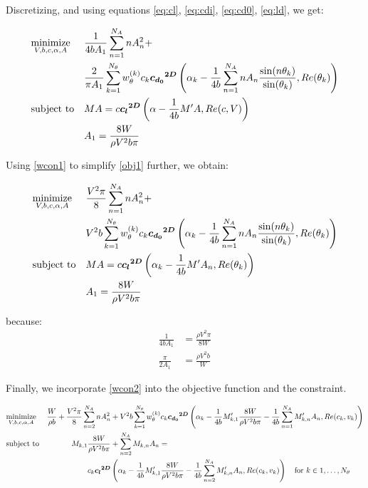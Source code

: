 \documentclass[letterpaper,12pt]{article}
\begin{document}
Discretizing, and using equations \ref{eq:cl}, \ref{eq:cdi}, \ref{eq:cd0}, \ref{eq:ld}, we get:


\begin{align}
	& \underset{V, b, c, \alpha, A}{\text{minimize}}
	& & \frac {1}{4bA_1} \sum_{n=1}^{N_A} n A_{n}^2 + \nonumber \\
	&&& \frac 2 {\pi A_1} \sum_{k=1}^{N_{\theta}} w_{\theta}^{(k)} c_k \boldsymbol{{c_{d_0}}^{2D}}\left( 
		\alpha_k - 
		\frac {1}{4b} \sum_{n=1}^{N_A} n A_n \frac{ \sin(n\theta_k) }{\sin(\theta_k)} , Re(\theta_k)
		\right) \label{obj1} \\
	& \text{subject to}
	& & MA = c \boldsymbol{{c_l}^{2D}} \left( \alpha - \frac {1}{4b} M' A , Re(c, V)\right)   \label{llcon1}\\
	& &  & A_1 = \frac{8W}{\rho V^2 b \pi} \label{wcon1}
\end{align}

Using \ref{wcon1} to simplify \ref{obj1} further, we obtain:

\begin{align}
	& \underset{V, b, c, \alpha, A}{\text{minimize}}
	& & \frac{V^2 \pi}{8}\sum_{n=1}^{N_A} n A_{n}^2 + \nonumber \\
	&&&  V^2 b  \sum_{k=1}^{N_{\theta}} w_{\theta}^{(k)} c_k \boldsymbol{{c_{d_0}}^{2D}}\left( 
		\alpha_k - 
		\frac {1}{4b} \sum_{n=1}^{N_A} n A_n \frac{ \sin(n\theta_k) }{\sin(\theta_k)} , Re(\theta_k)
		\right) \label{obj2} \\
	& \text{subject to}
	& & MA = c \boldsymbol{{c_l}^{2D}} \left( \alpha_k - \frac {1}{4b} M' A_n , Re(\theta_k)\right)  \label{llcon2}\\
	& &  & A_1 = \frac{8W}{\rho V^2 b \pi} \label{wcon2}
\end{align}

because:
\begin{align*}
	\frac{1}{4bA_1} &= \frac{\rho V^2 \pi}{8W} \\
	\frac{\pi}{2A_1} &= \frac{\rho V^2 b}{ W} 
\end{align*}

Finally, we incorporate \ref{wcon2} into the objective function and the constraint.

\begin{align*}
	& \underset{V, b, c, \alpha, A}{\text{minimize}} &
	\frac{W}{\rho b} + \frac{V^2 \pi}{8}\sum_{n=2}^{N_A} n A_{n}^2 &+
	  V^2 b  \sum_{k=1}^{N_{\theta}} w_{\theta}^{(k)} c_k \boldsymbol{{c_{d_0}}^{2D}}
	  \left( \alpha_k
	  - \frac {1}{4b} M'_{k,1}\frac{8W}{\rho V^2 b \pi}
	  - \frac {1}{4b}\sum_{n=1}^{N_{A}}M'_{k,n}A_n , Re(c_k, v_k)
	  \right)\\
	& \text{subject to} &
 	M_{k, 1} \frac{8W}{\rho V^2 b \pi} &+ \sum_{n=2}^{N_{A}} M_{k,n} A_n = \\
	& & c_k\boldsymbol{{c_l}^{2D}} & \left( \alpha_k
		 - \frac {1}{4b} M'_{k,1}\frac{8W}{\rho V^2 b \pi}
		 - \frac {1}{4b}\sum_{n=2}^{N_{A}}M'_{k,n}A_n , Re(c_k, v_k)\right)
		 \quad \text{for } k \in 1,\dots, N_{\theta}
\end{align*}
\end{document}
